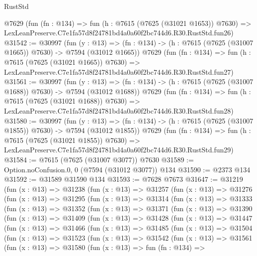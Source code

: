 \begin{lexlean}{RustStd}
\begin{coremodule}
    @7629
    (fun (fn : @134) =>
    fun (h : @7615 (@7625 (@31021 @1653)) @7630) =>
    LexLeanPreserve.C7e1fa57d8f24781bd4a0a60f2bc744d6.R30.RustStd.fun26)
@31542 := @30997
    (fun (y : @13) =>
    (fn : @134) -> (h : @7615 (@7625 (@31007 @1665)) @7630) -> @7594 (@31012 @1665))
    @7629
    (fun (fn : @134) =>
    fun (h : @7615 (@7625 (@31021 @1665)) @7630) =>
    LexLeanPreserve.C7e1fa57d8f24781bd4a0a60f2bc744d6.R30.RustStd.fun27)
@31561 := @30997
    (fun (y : @13) =>
    (fn : @134) -> (h : @7615 (@7625 (@31007 @1688)) @7630) -> @7594 (@31012 @1688))
    @7629
    (fun (fn : @134) =>
    fun (h : @7615 (@7625 (@31021 @1688)) @7630) =>
    LexLeanPreserve.C7e1fa57d8f24781bd4a0a60f2bc744d6.R30.RustStd.fun28)
@31580 := @30997
    (fun (y : @13) =>
    (fn : @134) -> (h : @7615 (@7625 (@31007 @1855)) @7630) -> @7594 (@31012 @1855))
    @7629
    (fun (fn : @134) =>
    fun (h : @7615 (@7625 (@31021 @1855)) @7630) =>
    LexLeanPreserve.C7e1fa57d8f24781bd4a0a60f2bc744d6.R30.RustStd.fun29)
@31584 := @7615 (@7625 (@31007 @3077)) @7630
@31589 := Option.noConfusion.{0, 0} (@7594 (@31012 @3077)) @134
@31590 := @2373 @134
@31592 := @31589 @31590 @134
@31593 := @7628 @7673
@31647 := @31219
    (fun (x : @13) =>
    @31238
      (fun (x : @13) =>
      @31257
        (fun (x : @13) =>
        @31276
          (fun (x : @13) =>
          @31295
            (fun (x : @13) =>
            @31314
              (fun (x : @13) =>
              @31333
                (fun (x : @13) =>
                @31352
                  (fun (x : @13) =>
                  @31371
                    (fun (x : @13) =>
                    @31390
                      (fun (x : @13) =>
                      @31409
                        (fun (x : @13) =>
                        @31428
                          (fun (x : @13) =>
                          @31447
                            (fun (x : @13) =>
                            @31466
                              (fun (x : @13) =>
                              @31485
                                (fun (x : @13) =>
                                @31504
                                  (fun (x : @13) =>
                                  @31523
                                    (fun (x : @13) =>
                                    @31542
                                      (fun (x : @13) =>
                                      @31561
                                        (fun (x : @13) =>
                                        @31580
                                          (fun (x : @13) =>
                                          fun (fn : @134) =>

\end{coremodule}
\end{lexlean}
